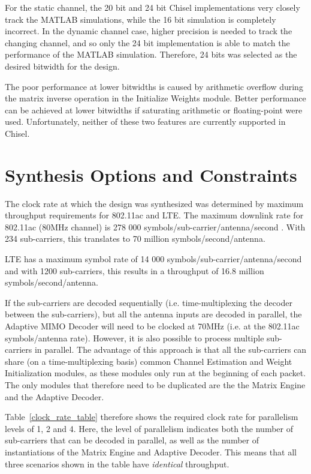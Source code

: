 \documentclass[journal]{IEEEtran}
\begin{document}
For the static channel, the 20 bit and 24 bit Chisel implementations very closely track the MATLAB simulations, while the 16 bit simulation is completely incorrect. In the dynamic channel case, higher precision is needed to track the changing channel, and so only the 24 bit implementation is able to match the performance of the MATLAB simulation. Therefore, 24 bits was selected as the desired bitwidth for the design.

The poor performance at lower bitwidths is caused by arithmetic overflow during the matrix inverse operation in the Initialize Weights module. Better performance can be achieved at lower bitwidths if saturating arithmetic or floating-point were used. Unfortunately, neither of these two features are currently supported in Chisel.


\section{Synthesis Options and Constraints}

The clock rate at which the design was synthesized was determined by maximum throughput requirements for 802.11ac and LTE. The maximum downlink rate for 802.11ac (80MHz channel) is 278 000 symbols/sub-carrier/antenna/second \cite{802_11_ac_handbook}. With 234 sub-carriers, this translates to 70 million symbols/second/antenna.

LTE has a maximum symbol rate of 14 000 symbols/sub-carrier/antenna/second \cite{lte_webpage} and with 1200 sub-carriers, this results in a throughput of 16.8 million symbols/second/antenna.

If the sub-carriers are decoded sequentially (i.e. time-multiplexing the decoder between the sub-carriers), but all the antenna inputs are decoded in parallel, the Adaptive MIMO Decoder will need to be clocked at 70MHz (i.e. at the 802.11ac symbols/antenna rate). However, it is also possible to process multiple sub-carriers in parallel. The advantage of this approach is that all the sub-carriers can share (on a time-multiplexing basis) common Channel Estimation and Weight Initialization modules, as these modules only run at the beginning of each packet. The only modules that therefore need to be duplicated are the the Matrix Engine and the Adaptive Decoder.

Table~\ref{clock_rate_table} therefore shows the required clock rate for parallelism levels of 1, 2 and 4. Here, the level of parallelism indicates both the number of sub-carriers that can be decoded in parallel, as well as the number of instantiations of the Matrix Engine and Adaptive Decoder. This means that all three scenarios shown in the table have {\em identical} throughput.
\end{document}

